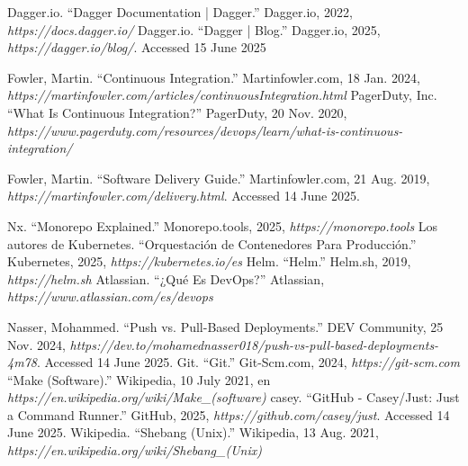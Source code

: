 

\begin{thebibliography}{99}
 Dagger.io. ``Dagger Documentation | Dagger.'' Dagger.io, 2022, {\it https://docs.dagger.io/}
 Dagger.io. “Dagger | Blog.” Dagger.io, 2025, {\it https://dagger.io/blog/}. Accessed 15 June 2025

 Fowler, Martin. ``Continuous Integration.'' Martinfowler.com, 18 Jan. 2024, {\it https://martinfowler.com/articles/continuousIntegration.html}
 PagerDuty, Inc. ``What Is Continuous Integration?'' PagerDuty, 20 Nov. 2020, {\it https://www.pagerduty.com/resources/devops/learn/what-is-continuous-integration/}

 Fowler, Martin. ``Software Delivery Guide.'' Martinfowler.com, 21 Aug. 2019, {\it https://martinfowler.com/delivery.html}. Accessed 14 June 2025.

 Nx. ``Monorepo Explained.'' Monorepo.tools, 2025, {\it https://monorepo.tools}
 Los autores de Kubernetes. ``Orquestación de Contenedores Para Producción.'' Kubernetes, 2025, {\it https://kubernetes.io/es}
 Helm. ``Helm.'' Helm.sh, 2019, {\it https://helm.sh}
 Atlassian. ``¿Qué Es DevOps?'' Atlassian, {\it https://www.atlassian.com/es/devops}

 Nasser, Mohammed. ``Push vs. Pull-Based Deployments.'' DEV Community, 25 Nov. 2024, {\it https://dev.to/mohamednasser018/push-vs-pull-based-deployments-4m78}. Accessed 14 June 2025.
 Git. ``Git.'' Git-Scm.com, 2024, {\it https://git-scm.com}
 ``Make (Software).'' Wikipedia, 10 July 2021, en {\it https://en.wikipedia.org/wiki/Make\_(software)}
 casey. ``GitHub - Casey/Just: Just a Command Runner.'' GitHub, 2025, {\it https://github.com/casey/just}. Accessed 14 June 2025.
 Wikipedia. ``Shebang (Unix).'' Wikipedia, 13 Aug. 2021, {\it https://en.wikipedia.org/wiki/Shebang\_(Unix)}




\end{thebibliography}

